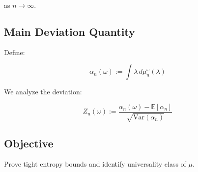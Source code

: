 as $n \to \infty$.

\subsection{Main Deviation Quantity}

Define:

\[
\alpha_n(\omega) := \int \lambda \, d\mu_n^\omega(\lambda)
\]

We analyze the deviation:

\[
Z_n(\omega) := \frac{\alpha_n(\omega) - \mathbb{E}[\alpha_n]}{\sqrt{\mathrm{Var}(\alpha_n)}}
\]

\subsection{Objective}

Prove tight entropy bounds and identify universality class of $\mu$.
